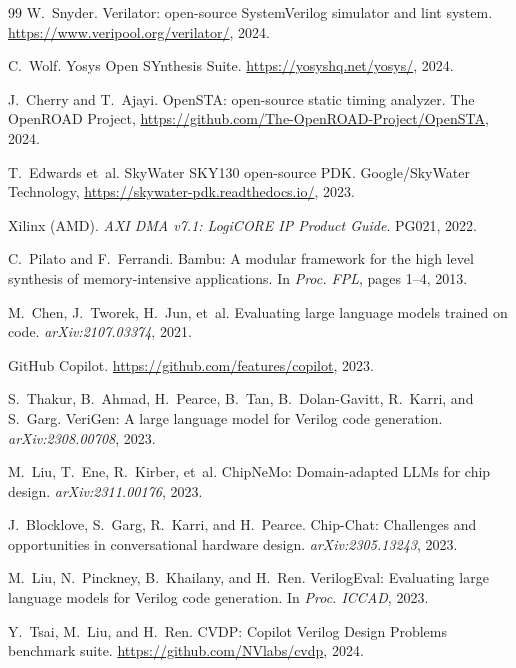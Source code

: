 \documentclass[11pt,twocolumn]{article}
\begin{document}
\begin{thebibliography}{99}
W.~Snyder.
Verilator: open-source SystemVerilog simulator and lint system.
\url{https://www.veripool.org/verilator/}, 2024.

C.~Wolf.
Yosys Open SYnthesis Suite.
\url{https://yosyshq.net/yosys/}, 2024.

J.~Cherry and T.~Ajayi.
OpenSTA: open-source static timing analyzer.
The OpenROAD Project, \url{https://github.com/The-OpenROAD-Project/OpenSTA}, 2024.

T.~Edwards et~al.
SkyWater SKY130 open-source PDK.
Google/SkyWater Technology, \url{https://skywater-pdk.readthedocs.io/}, 2023.

Xilinx (AMD).
\textit{AXI DMA v7.1: LogiCORE IP Product Guide}.
PG021, 2022.

C.~Pilato and F.~Ferrandi.
Bambu: A modular framework for the high level synthesis of memory-intensive applications.
In \textit{Proc. FPL}, pages 1--4, 2013.

M.~Chen, J.~Tworek, H.~Jun, et~al.
Evaluating large language models trained on code.
\textit{arXiv:2107.03374}, 2021.

GitHub Copilot.
\url{https://github.com/features/copilot}, 2023.

S.~Thakur, B.~Ahmad, H.~Pearce, B.~Tan, B.~Dolan-Gavitt, R.~Karri, and S.~Garg.
VeriGen: A large language model for Verilog code generation.
\textit{arXiv:2308.00708}, 2023.

M.~Liu, T.~Ene, R.~Kirber, et~al.
ChipNeMo: Domain-adapted LLMs for chip design.
\textit{arXiv:2311.00176}, 2023.

J.~Blocklove, S.~Garg, R.~Karri, and H.~Pearce.
Chip-Chat: Challenges and opportunities in conversational hardware design.
\textit{arXiv:2305.13243}, 2023.

M.~Liu, N.~Pinckney, B.~Khailany, and H.~Ren.
VerilogEval: Evaluating large language models for Verilog code generation.
In \textit{Proc. ICCAD}, 2023.

Y.~Tsai, M.~Liu, and H.~Ren.
CVDP: Copilot Verilog Design Problems benchmark suite.
\url{https://github.com/NVlabs/cvdp}, 2024.

\end{thebibliography}
\end{document}
